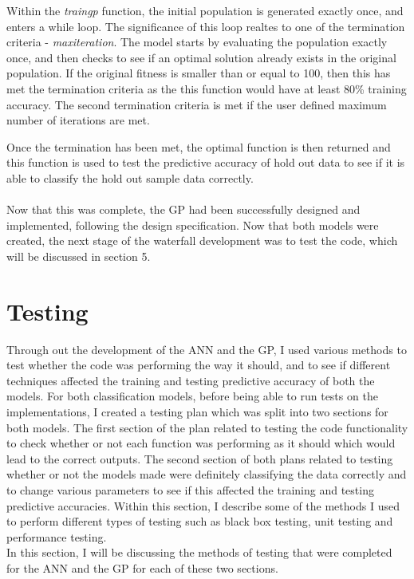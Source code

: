 \documentclass[11pt]{article}
\begin{document}
Within the \textit{train\textunderscore gp} function, the initial population is generated exactly once, and enters a while loop. The significance of this loop realtes to one of the termination criteria - \textit{max\textunderscore iteration}. The model starts by evaluating the population exactly once, and then checks to see if an optimal solution already exists in the original population. If the original fitness is smaller than or equal to 100, then this has met the termination criteria as the this function would have at least 80\% training accuracy. The second termination criteria is met if the user defined maximum number of iterations are met. 

Once the termination has been met, the optimal function is then returned and this function is used to test the predictive accuracy of hold out data to see if it is able to classify the hold out sample data correctly. \\\\
Now that this was complete, the GP had been successfully designed and implemented, following the design specification. Now that both models were created, the next stage of the waterfall development was to test the code, which will be discussed in section 5. 
\newpage
\section{Testing}
Through out the development of the ANN and the GP, I used various methods to test whether the code was performing the way it should, and to see if different techniques affected the training and testing predictive accuracy of both the models. For both classification models, before being able to run tests on the implementations, I created a testing plan which was split into two sections for both models. The first section of the plan related to testing the code functionality to check whether or not each function was performing as it should which would lead to the correct outputs. The second section of both plans related to testing whether or not the models made were definitely classifying the data correctly and to change various parameters to see if this affected the training and testing predictive accuracies. Within this section, I describe some of the methods I used to perform different types of testing such as black box testing, unit testing and performance testing. \\
In this section, I will be discussing the methods of testing that were completed for the ANN and the GP for each of these two sections. 
\end{document}
